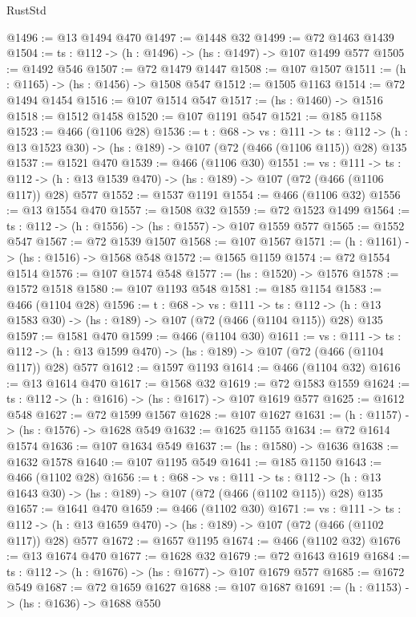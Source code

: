 \begin{lexlean}{RustStd}
\begin{coremodule}
@1496 := @13 @1494 @470
@1497 := @1448 @32
@1499 := @72 @1463 @1439
@1504 := {ts : @112} -> (h : @1496) -> (hs : @1497) -> @107 @1499 @577
@1505 := @1492 @546
@1507 := @72 @1479 @1447
@1508 := @107 @1507
@1511 := (h : @1165) -> (hs : @1456) -> @1508 @547
@1512 := @1505 @1163
@1514 := @72 @1494 @1454
@1516 := @107 @1514 @547
@1517 := (hs : @1460) -> @1516
@1518 := @1512 @1458
@1520 := @107 @1191 @547
@1521 := @185 @1158
@1523 := @466 (@1106 @28)
@1536 := {t : @68} ->
  {vs : @111} ->
  {ts : @112} -> (h : @13 @1523 @30) -> (hs : @189) -> @107 (@72 (@466 (@1106 @115)) @28) @135
@1537 := @1521 @470
@1539 := @466 (@1106 @30)
@1551 := {vs : @111} ->
  {ts : @112} -> (h : @13 @1539 @470) -> (hs : @189) -> @107 (@72 (@466 (@1106 @117)) @28) @577
@1552 := @1537 @1191
@1554 := @466 (@1106 @32)
@1556 := @13 @1554 @470
@1557 := @1508 @32
@1559 := @72 @1523 @1499
@1564 := {ts : @112} -> (h : @1556) -> (hs : @1557) -> @107 @1559 @577
@1565 := @1552 @547
@1567 := @72 @1539 @1507
@1568 := @107 @1567
@1571 := (h : @1161) -> (hs : @1516) -> @1568 @548
@1572 := @1565 @1159
@1574 := @72 @1554 @1514
@1576 := @107 @1574 @548
@1577 := (hs : @1520) -> @1576
@1578 := @1572 @1518
@1580 := @107 @1193 @548
@1581 := @185 @1154
@1583 := @466 (@1104 @28)
@1596 := {t : @68} ->
  {vs : @111} ->
  {ts : @112} -> (h : @13 @1583 @30) -> (hs : @189) -> @107 (@72 (@466 (@1104 @115)) @28) @135
@1597 := @1581 @470
@1599 := @466 (@1104 @30)
@1611 := {vs : @111} ->
  {ts : @112} -> (h : @13 @1599 @470) -> (hs : @189) -> @107 (@72 (@466 (@1104 @117)) @28) @577
@1612 := @1597 @1193
@1614 := @466 (@1104 @32)
@1616 := @13 @1614 @470
@1617 := @1568 @32
@1619 := @72 @1583 @1559
@1624 := {ts : @112} -> (h : @1616) -> (hs : @1617) -> @107 @1619 @577
@1625 := @1612 @548
@1627 := @72 @1599 @1567
@1628 := @107 @1627
@1631 := (h : @1157) -> (hs : @1576) -> @1628 @549
@1632 := @1625 @1155
@1634 := @72 @1614 @1574
@1636 := @107 @1634 @549
@1637 := (hs : @1580) -> @1636
@1638 := @1632 @1578
@1640 := @107 @1195 @549
@1641 := @185 @1150
@1643 := @466 (@1102 @28)
@1656 := {t : @68} ->
  {vs : @111} ->
  {ts : @112} -> (h : @13 @1643 @30) -> (hs : @189) -> @107 (@72 (@466 (@1102 @115)) @28) @135
@1657 := @1641 @470
@1659 := @466 (@1102 @30)
@1671 := {vs : @111} ->
  {ts : @112} -> (h : @13 @1659 @470) -> (hs : @189) -> @107 (@72 (@466 (@1102 @117)) @28) @577
@1672 := @1657 @1195
@1674 := @466 (@1102 @32)
@1676 := @13 @1674 @470
@1677 := @1628 @32
@1679 := @72 @1643 @1619
@1684 := {ts : @112} -> (h : @1676) -> (hs : @1677) -> @107 @1679 @577
@1685 := @1672 @549
@1687 := @72 @1659 @1627
@1688 := @107 @1687
@1691 := (h : @1153) -> (hs : @1636) -> @1688 @550

\end{coremodule}
\end{lexlean}
